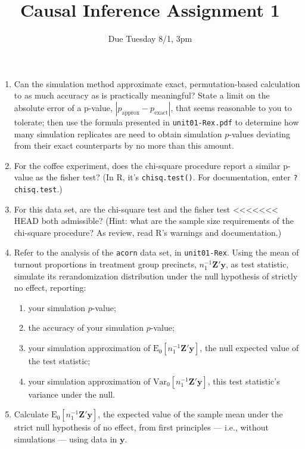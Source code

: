 \documentclass{article}
\title{Causal Inference Assignment 1}
\author{Due Tuesday 8/1, 3pm}
\begin{document}
\maketitle

\begin{enumerate}
\item Can the simulation method approximate exact, permutation-based
  calculation to as much accuracy as is practically meaningful?
  State a limit on the absolute error of a p-value,
  $|p_{\text{approx}} - p_{\text{exact}}|$, that seems reasonable to
  you to tolerate; then use the formula presented in
  \texttt{unit01-Rex.pdf} to determine how many simulation replicates
  are need to obtain simulation $p$-values deviating from their exact
  counterparts by no more than this amount.
\item For the coffee experiment, does the chi-square procedure report
  a similar p-value as the fisher test?  (In R,
  it's \texttt{chisq.test()}. For documentation, enter \texttt{?chisq.test}.)
\item For this data set, are the chi-square test and the fisher test
<<<<<<< HEAD
  both admissible? (Hint: what are the sample size requirements of the
  chi-square procedure? As review, read R's warnings and documentation.)
\item Refer to the analysis of the \texttt{acorn} data set, in
  \texttt{unit01-Rex}.  Using the mean of turnout proportions in
  treatment group precincts, $n_{1}^{-1}\mathbf{Z}'\mathbf{y}$, as
  test statistic, simulate its rerandomization distribution under the
  null hypothesis of strictly no effect, reporting: \label{q:simmoments}
  \begin{enumerate}
  \item your simulation $p$-value; 
  \item the accuracy of your simulation $p$-value; 
  \item your simulation approximation of $\mathrm{E}_{0}[
    n_{1}^{-1}\mathbf{Z}'\mathbf{y}]$, the null expected value of the test
    statistic; 
  \item your simulation approximation of
    $\mathrm{Var}_{0}[n_{1}^{-1}\mathbf{Z}'\mathbf{y}]$, this test
    statistic's variance under the null.
  \end{enumerate}
\item Calculate $\mathrm{E}_{0} [ n_{1}^{-1}\mathbf{Z}'\mathbf{y} ]$, the expected value of the
  sample mean under the strict null hypothesis of no effect, from first principles --- i.e., without simulations ---  using data in $\mathbf{y}$.  \label{q:exactEV}

\end{enumerate}
\end{document}
